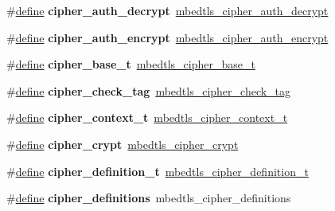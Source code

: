 \begin{DoxyCompactItemize}
\item 
\mbox{\label{compat-1_83_8h_ac41c16752bb169e19d3ed57f5eb0b702}} 
\#\hyperlink{structdefine}{define} {\bfseries cipher\+\_\+auth\+\_\+decrypt}~\hyperlink{cipher_8h_a715666cc823dc180277890b00f8a7f5e}{mbedtls\+\_\+cipher\+\_\+auth\+\_\+decrypt}
\item 
\mbox{\label{compat-1_83_8h_a51d85c6a855f0c63a183edc4b86e4e5c}} 
\#\hyperlink{structdefine}{define} {\bfseries cipher\+\_\+auth\+\_\+encrypt}~\hyperlink{cipher_8h_a65b2df023770ee3123a3f2cdb10497a0}{mbedtls\+\_\+cipher\+\_\+auth\+\_\+encrypt}
\item 
\mbox{\label{compat-1_83_8h_a171eb2bc27a802e881ece113e74195c7}} 
\#\hyperlink{structdefine}{define} {\bfseries cipher\+\_\+base\+\_\+t}~\hyperlink{structmbedtls__cipher__base__t}{mbedtls\+\_\+cipher\+\_\+base\+\_\+t}
\item 
\mbox{\label{compat-1_83_8h_a5cd2a490b11d57931874ef47f17460bd}} 
\#\hyperlink{structdefine}{define} {\bfseries cipher\+\_\+check\+\_\+tag}~\hyperlink{cipher_8h_ad3388eaa42a44db6a0b0339dd49f15ba}{mbedtls\+\_\+cipher\+\_\+check\+\_\+tag}
\item 
\mbox{\label{compat-1_83_8h_a71946cc6e4cdbdc49d5c23fcd45f1466}} 
\#\hyperlink{structdefine}{define} {\bfseries cipher\+\_\+context\+\_\+t}~\hyperlink{structmbedtls__cipher__context__t}{mbedtls\+\_\+cipher\+\_\+context\+\_\+t}
\item 
\mbox{\label{compat-1_83_8h_a3e11f22f036dc11632daf2b1d15fd4a5}} 
\#\hyperlink{structdefine}{define} {\bfseries cipher\+\_\+crypt}~\hyperlink{cipher_8h_a1c249f6ee1a0d2c906927c7790c41dc5}{mbedtls\+\_\+cipher\+\_\+crypt}
\item 
\mbox{\label{compat-1_83_8h_a89afbda789c5b91ab9ac289374b20097}} 
\#\hyperlink{structdefine}{define} {\bfseries cipher\+\_\+definition\+\_\+t}~\hyperlink{structmbedtls__cipher__definition__t}{mbedtls\+\_\+cipher\+\_\+definition\+\_\+t}
\item 
\mbox{\label{compat-1_83_8h_af3d10452dd1301d15e115c99f170897e}} 
\#\hyperlink{structdefine}{define} {\bfseries cipher\+\_\+definitions}~mbedtls\+\_\+cipher\+\_\+definitions

\end{DoxyCompactItemize}

